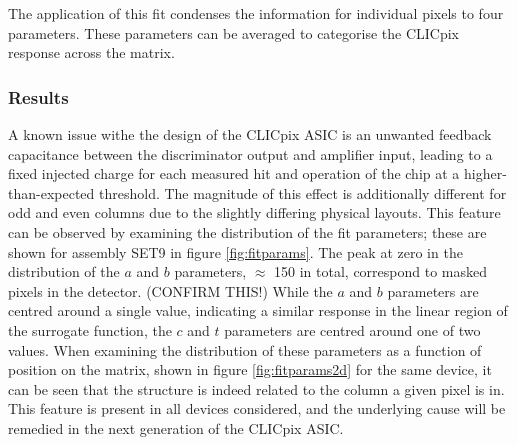 The application of this fit condenses the information for individual pixels to four parameters.  These parameters can be averaged to categorise the CLICpix response across the matrix.  


\subsubsection{Results}
\label{sec:testpulsecalibrationresults}

A known issue withe the design of the CLICpix ASIC is an unwanted feedback capacitance between the discriminator output and amplifier input, leading to a fixed injected charge for each measured hit and operation of the chip at a higher-than-expected threshold. The magnitude of this effect is additionally different for odd and even columns due to the slightly differing physical layouts. This feature can be observed by examining the distribution of the fit parameters;  these are shown for assembly SET9 in figure \ref{fig:fitparams}.  The peak at zero in the distribution of the $a$ and $b$ parameters, $\approx$ 150 in total, correspond to masked pixels in the detector. (CONFIRM THIS!) While the $a$ and $b$ parameters are centred around a single value, indicating a similar response in the linear region of the surrogate function, the $c$ and $t$ parameters are centred around one of two values.  When examining the distribution of these parameters as a function of position on the matrix, shown in figure \ref{fig:fitparams2d} for the same device, it can be seen that the structure is indeed related to the column a given pixel is in.  This feature is present in all devices considered, and the underlying cause will be remedied in the next generation of the CLICpix ASIC.


